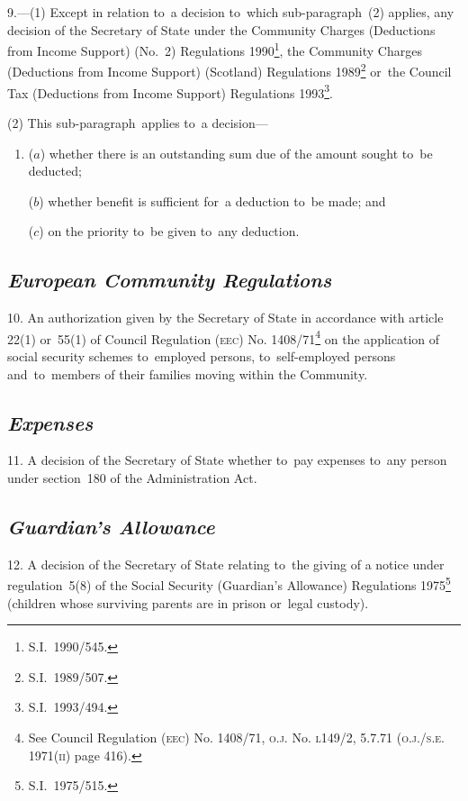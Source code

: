 \documentclass[12pt,a4paper]{article}
\begin{document}
\medskip

9.—(1) Except in relation to~a decision to~which sub-paragraph~(2) applies, any decision of the Secretary of State under the Community Charges (Deductions from Income Support) (No.\ 2) Regulations 1990\footnote{\frenchspacing S.I.~1990/545.}, the Community Charges (Deductions from Income Support) (Scotland) Regulations 1989\footnote{\frenchspacing S.I.~1989/507.} or~the Council Tax (Deductions from Income Support) Regulations 1993\footnote{\frenchspacing S.I.~1993/494.}.

(2) This sub-paragraph~applies to~a decision—
\begin{enumerate}\item[]
($a$) whether there is an outstanding sum due of the amount sought to~be deducted;

($b$) whether benefit is sufficient for~a deduction to~be made; and

($c$) on the priority to~be given to~any deduction.
\end{enumerate}

\subsection*{\itshape European Community Regulations}

10.  An authorization given by the Secretary of State in accordance with article 22(1) or~55(1) of Council Regulation \textsc{\lowercase{(EEC)}} No. 1408/71\footnote{\frenchspacing See Council Regulation \textsc{\lowercase{(EEC)}} No. 1408/71, \textsc{\lowercase{O.J.}} No. \textsc{\lowercase{L149/2, 5.7.71 (O.J./S.E. 1971(II)}} page 416).} on the application of social security schemes to~employed persons, to~self-employed persons and~to~members of their families moving within the Community.

\subsection*{\itshape Expenses}

11.  A decision of the Secretary of State whether to~pay expenses to~any person under section~180 of the Administration Act.

\subsection*{\itshape Guardian’s Allowance}

12.  A decision of the Secretary of State relating to~the giving of a notice under regulation~5(8) of the Social Security (Guardian’s Allowance) Regulations 1975\footnote{\frenchspacing S.I.~1975/515.} (children whose surviving parents are in prison or~legal custody).
\end{document}
